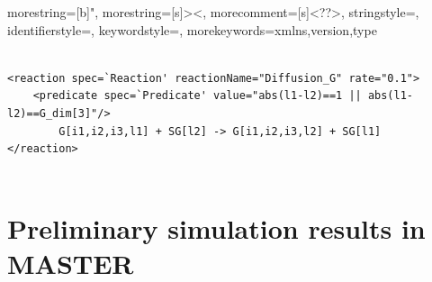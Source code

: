 \documentclass{article}
\begin{document}

{
  morestring=[b]",
  morestring=[s]{>}{<},
  morecomment=[s]{<?}{?>},
  stringstyle=\color{black},
  identifierstyle=\color{darkblue},
  keywordstyle=\color{cyan},
  morekeywords={xmlns,version,type}%
}

\footnotesize{
\begin{lstlisting}

<reaction spec=`Reaction' reactionName="Diffusion_G" rate="0.1">
    <predicate spec=`Predicate' value="abs(l1-l2)==1 || abs(l1-l2)==G_dim[3]"/>
        G[i1,i2,i3,l1] + SG[l2] -> G[i1,i2,i3,l2] + SG[l1]
</reaction>          
        
\end{lstlisting}}

\section{Preliminary simulation results in MASTER}
\end{document}
